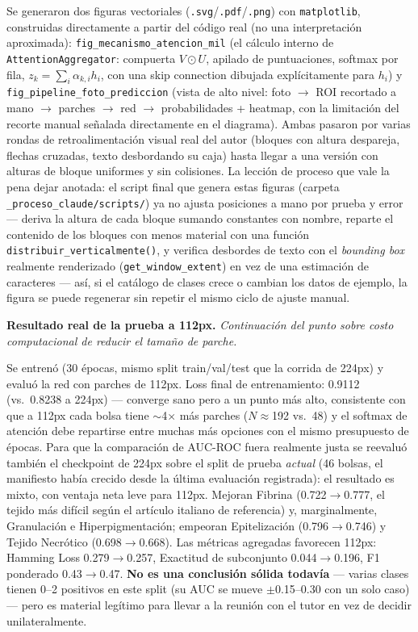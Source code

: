 \documentclass[12pt,letterpaper]{report}
\newcommand{\entrada}[2]{%
    \vspace{0.6em}
    \noindent\textbf{#1.} \textit{#2}
    \vspace{0.3em}
    \par
}
\begin{document}
Se generaron dos figuras vectoriales (\texttt{.svg}/\texttt{.pdf}/\texttt{.png}) con
\texttt{matplotlib}, construidas directamente a partir del código real (no una interpretación
aproximada): \texttt{fig\_mecanismo\_atencion\_mil} (el cálculo interno de
\texttt{AttentionAggregator}: compuerta $V \odot U$, apilado de puntuaciones, softmax por fila,
$z_k = \sum_i \alpha_{k,i} h_i$, con una skip connection dibujada explícitamente para $h_i$) y
\texttt{fig\_pipeline\_foto\_prediccion} (vista de alto nivel: foto $\to$ ROI recortado a mano $\to$
parches $\to$ red $\to$ probabilidades + heatmap, con la limitación del recorte manual señalada
directamente en el diagrama). Ambas pasaron por varias rondas de retroalimentación visual real del
autor (bloques con altura despareja, flechas cruzadas, texto desbordando su caja) hasta llegar a una
versión con alturas de bloque uniformes y sin colisiones. La lección de proceso que vale la pena
dejar anotada: el script final que genera estas figuras (carpeta
\texttt{\_proceso\_claude/scripts/}) ya no ajusta posiciones a mano por prueba y error --- deriva la
altura de cada bloque sumando
constantes con nombre, reparte el contenido de los bloques con menos material con una función
\texttt{distribuir\_verticalmente()}, y verifica desbordes de texto con el \emph{bounding box}
realmente renderizado (\texttt{get\_window\_extent}) en vez de una estimación de caracteres --- así,
si el catálogo de clases crece o cambian los datos de ejemplo, la figura se puede regenerar sin
repetir el mismo ciclo de ajuste manual.

\entrada{Resultado real de la prueba a 112px}{Continuación del punto sobre costo computacional de
reducir el tamaño de parche.}

Se entrenó (30 épocas, mismo split train/val/test que la corrida de 224px) y evaluó la red con
parches de 112px. Loss final de entrenamiento: 0.9112 (vs.\ 0.8238 a 224px) --- converge sano pero a
un punto más alto, consistente con que a 112px cada bolsa tiene $\sim$4$\times$ más parches
($N\approx$192 vs.\ 48) y el softmax de atención debe repartirse entre muchas más opciones con el
mismo presupuesto de épocas. Para que la comparación de AUC-ROC fuera realmente justa se
reevaluó también el checkpoint de 224px sobre el split de prueba \emph{actual} (46 bolsas, el
manifiesto había crecido desde la última evaluación registrada): el resultado es mixto, con ventaja
neta leve para 112px. Mejoran Fibrina (0.722$\to$0.777, el tejido más difícil según el artículo
italiano de referencia) y, marginalmente, Granulación e Hiperpigmentación; empeoran Epitelización
(0.796$\to$0.746) y Tejido Necrótico (0.698$\to$0.668). Las métricas agregadas favorecen 112px:
Hamming Loss 0.279$\to$0.257, Exactitud de subconjunto 0.044$\to$0.196, F1 ponderado 0.43$\to$0.47.
\textbf{No es una conclusión sólida todavía} --- varias clases tienen 0--2 positivos en este split
(su AUC se mueve $\pm$0.15--0.30 con un solo caso) --- pero es material legítimo para llevar a la
reunión con el tutor en vez de decidir unilateralmente.
\end{document}
